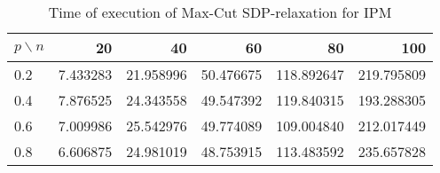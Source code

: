 \documentclass[12pt]{article}
\begin{document}
\begin{table}[H]
	\centering
	\begin{tabular}{|lrrrrr|}
		\toprule
		{$p \backslash n$} &       20  &        40  &        60  &         80  &         100 \\
		\midrule
		0.2 &  7.433283 &  21.958996 &  50.476675 &  118.892647 &  219.795809 \\
		0.4 &  7.876525 &  24.343558 &  49.547392 &  119.840315 &  193.288305 \\
		0.6 &  7.009986 &  25.542976 &  49.774089 &  109.004840 &  212.017449 \\
		0.8 &  6.606875 &  24.981019 &  48.753915 &  113.483592 &  235.657828 \\
		\bottomrule
	\end{tabular}
	\caption{Time of execution  of Max-Cut SDP-relaxation for IPM}
\end{table}
	
\end{document}
